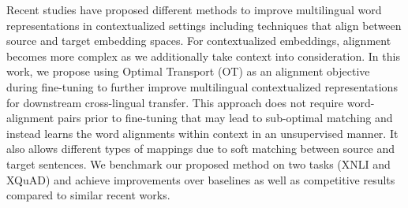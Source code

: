 Recent studies have proposed different methods to improve multilingual word representations in contextualized settings including techniques that align between source and target embedding spaces.  For contextualized embeddings, alignment becomes more complex as we additionally take context into consideration.  In this work,  we propose using Optimal Transport (OT) as an alignment objective during fine-tuning to further improve multilingual contextualized representations for downstream cross-lingual transfer. This approach does not require word-alignment pairs prior to fine-tuning that may lead to sub-optimal matching and instead learns the word alignments within context in an  unsupervised  manner.   It  also  allows  different types of mappings due to soft matching between source and target sentences. We benchmark our proposed method on two tasks (XNLI and XQuAD) and achieve improvements over baselines as well as competitive results compared to similar recent works.
